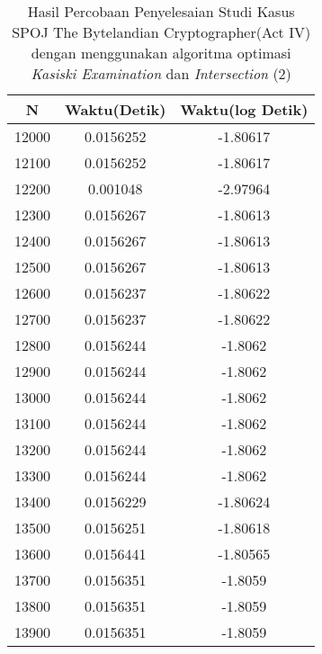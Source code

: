 \begin{table}[H]
\centering
\caption {Hasil Percobaan Penyelesaian Studi Kasus SPOJ The Bytelandian Cryptographer(Act IV) dengan menggunakan algoritma optimasi \textit{Kasiski Examination} dan \textit{Intersection} (2)}
\begin{tabular}{|c|c|c|}\hline
N&Waktu(Detik)&Waktu(log Detik)\\ \hline
12000&0.0156252&-1.80617\\ \hline
12100&0.0156252&-1.80617\\ \hline
12200&0.001048&-2.97964\\ \hline
12300&0.0156267&-1.80613\\ \hline
12400&0.0156267&-1.80613\\ \hline
12500&0.0156267&-1.80613\\ \hline
12600&0.0156237&-1.80622\\ \hline
12700&0.0156237&-1.80622\\ \hline
12800&0.0156244&-1.8062\\ \hline
12900&0.0156244&-1.8062\\ \hline
13000&0.0156244&-1.8062\\ \hline
13100&0.0156244&-1.8062\\ \hline
13200&0.0156244&-1.8062\\ \hline
13300&0.0156244&-1.8062\\ \hline
13400&0.0156229&-1.80624\\ \hline
13500&0.0156251&-1.80618\\ \hline
13600&0.0156441&-1.80565\\ \hline
13700&0.0156351&-1.8059\\ \hline
13800&0.0156351&-1.8059\\ \hline
13900&0.0156351&-1.8059\\ \hline
\end{tabular}
\label{tab:res5}
\end{table}
